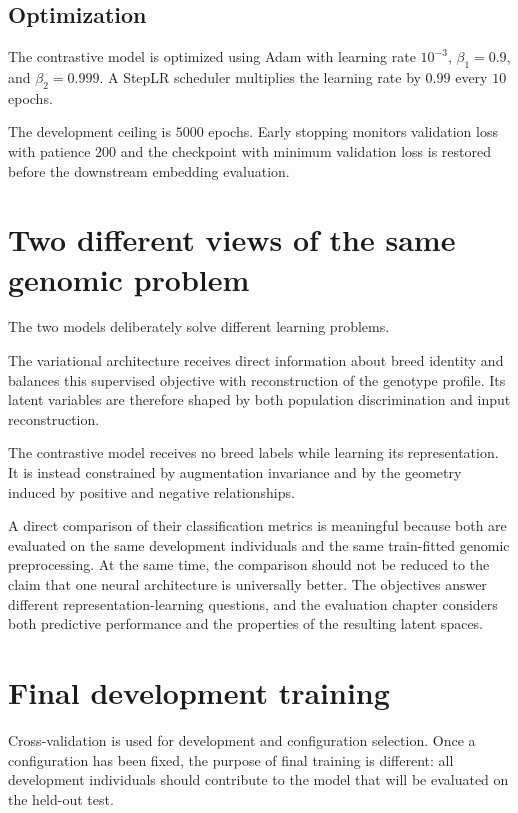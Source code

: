 \subsection{Optimization}

The contrastive model is optimized using Adam with learning rate
$10^{-3}$, $\beta_1=0.9$, and $\beta_2=0.999$. A StepLR scheduler
multiplies the learning rate by $0.99$ every $10$ epochs.

The development ceiling is $5000$ epochs. Early stopping monitors
validation loss with patience $200$ and the checkpoint with minimum
validation loss is restored before the downstream embedding
evaluation.



\section{Two different views of the same genomic problem}
\label{sec:two_views_genomic_problem}

The two models deliberately solve different learning problems.

The variational architecture receives direct information about breed
identity and balances this supervised objective with reconstruction of
the genotype profile. Its latent variables are therefore shaped by
both population discrimination and input reconstruction.

The contrastive model receives no breed labels while learning its
representation. It is instead constrained by augmentation invariance
and by the geometry induced by positive and negative relationships.

A direct comparison of their classification metrics is meaningful
because both are evaluated on the same development individuals and the
same train-fitted genomic preprocessing. At the same time, the
comparison should not be reduced to the claim that one neural
architecture is universally better. The objectives answer different
representation-learning questions, and the evaluation chapter
considers both predictive performance and the properties of the
resulting latent spaces.

\section{Final development training}
\label{sec:final_training_protocol}

Cross-validation is used for development and configuration selection.
Once a configuration has been fixed, the purpose of final training is
different: all development individuals should contribute to the model
that will be evaluated on the held-out test.

